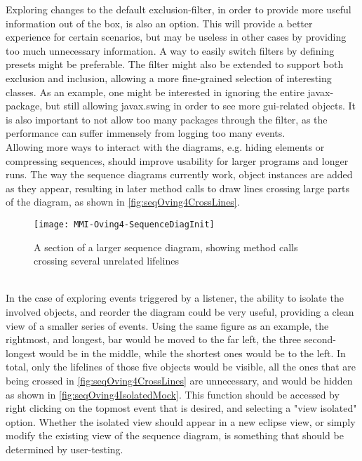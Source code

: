 Exploring changes to the default exclusion-filter, in order to provide more useful information out of the box, is also an option.
This will provide a better experience for certain scenarios, but may be useless in other cases by providing too much unnecessary information.
A way to easily switch filters by defining presets might be preferable.
The filter might also be extended to support both exclusion and inclusion, allowing a more fine-grained selection of interesting classes.
As an example, one might be interested in ignoring the entire javax-package, but still allowing javax.swing in order to see more \gls{gui}-related objects.
It is also important to not allow too many packages through the filter, as the performance can suffer immensely from logging too many events.
~\\

Allowing more ways to interact with the diagrams, e.g. hiding elements or compressing sequences, should improve usability for larger programs and longer runs.
The way the sequence diagrams currently work, object instances are added as they appear, resulting in later method calls to draw lines crossing large parts of the diagram, as shown in \autoref{fig:seqOving4CrossLines}.
~\\

\begin{figure}[H]
	\centering
	\texttt{[image: MMI-Oving4-SequenceDiagInit]}
	\caption{A section of a larger sequence diagram, showing method calls crossing several unrelated lifelines}
	\label{fig:seqOving4CrossLines}
\end{figure}
~\\

In the case of exploring events triggered by a listener, the ability to isolate the involved objects, and reorder the diagram could be very useful, providing a clean view of a smaller series of events.
Using the same figure as an example, the rightmost, and longest, bar would be moved to the far left, the three second-longest would be in the middle, while the shortest ones would be to the left.
In total, only the lifelines of those five objects would be visible, all the ones that are being crossed in \autoref{fig:seqOving4CrossLines} are unnecessary, and would be hidden as shown in \autoref{fig:seqOving4IsolatedMock}.
This function should be accessed by right clicking on the topmost event that is desired, and selecting a "view isolated" option.
Whether the isolated view should appear in a new eclipse view, or simply modify the existing view of the sequence diagram, is something that should be determined by user-testing.
~\\

